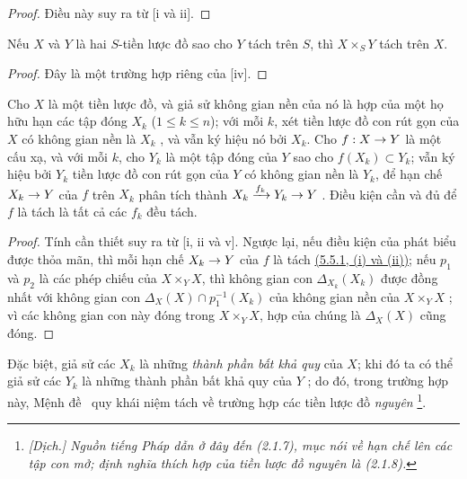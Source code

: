 \documentclass[oneside]{amsart}
\makeatletter
\renewcommand{\leq}{\leqslant}
\newcommand{\ega@arrow}[2]{\mathchoice{#1}{#2}{#2}{#2}}
\renewcommand{\to}{\ega@arrow{\longrightarrow}{\rightarrow}}
\let\EGAOriginalLabel\label
\renewcommand{\label}[1]{\phantomsection\EGAOriginalLabel{#1}}
\makeatother
\begin{document}
\begin{proof}
Điều này suy ra từ [i và ii].
\end{proof}

\begin{corollary}[5.5.3]
\label{I.5.5.3}
Nếu $X$ và $Y$ là hai $S$-tiền lược đồ sao cho $Y$ tách trên $S$, thì
$X\times_S Y$ tách trên $X$.
\end{corollary}

\begin{proof}
Đây là một trường hợp riêng của [iv].
\end{proof}

\begin{proposition}[5.5.4]
\label{I.5.5.4}
Cho $X$ là một tiền lược đồ, và giả sử không gian nền của nó là hợp của một họ
hữu hạn các tập đóng $X_k$ ($1\leq k\leq n$); với mỗi $k$, xét tiền lược đồ con
rút gọn của $X$ có không gian nền là $X_k$ , và vẫn ký hiệu nó
bởi $X_k$.
Cho $f:X\to Y$ là một cấu xạ, và với mỗi $k$, cho $Y_k$ là một tập đóng của
$Y$ sao cho $f(X_k)\subset Y_k$; vẫn ký hiệu bởi $Y_k$ tiền lược đồ con rút
gọn của $Y$ có không gian nền là $Y_k$, để hạn chế $X_k\to Y$ của $f$ trên
$X_k$ phân tích thành $X_k\xrightarrow{f_k}Y_k\to Y$ .
Điều kiện cần và đủ để $f$ là tách là tất cả các $f_k$ đều tách.
\end{proposition}

\begin{proof}
Tính cần thiết suy ra từ [i, ii và v].
Ngược lại, nếu điều kiện của phát biểu được thỏa mãn, thì mỗi hạn chế
$X_k\to Y$ của $f$ là tách \hyperref[I.5.5.1]{(5.5.1, (i) và (ii))}; nếu
$p_1$ và $p_2$ là các phép chiếu của $X\times_Y X$, thì không gian con
$\Delta_{X_k}(X_k)$ được đồng nhất với không gian con
$\Delta_X(X)\cap p_1^{-1}(X_k)$ của không gian nền của $X\times_Y X$
; vì các không gian con này đóng trong $X\times_Y X$, hợp của
chúng là $\Delta_X(X)$ cũng đóng.
\end{proof}

Đặc biệt, giả sử các $X_k$ là những \emph{thành phần bất khả quy} của $X$;
khi đó ta có thể giả sử các $Y_k$ là những thành phần bất khả quy của $Y$
; do đó, trong trường hợp này, Mệnh đề~ quy
khái niệm tách về trường hợp các tiền lược đồ \emph{nguyên}
\footnote{\emph{[Dịch.] Nguồn tiếng Pháp dẫn ở đây đến
(2.1.7), mục nói về hạn chế lên các tập con mở; định nghĩa thích hợp của tiền
lược đồ nguyên là (2.1.8).}}.
\end{document}
